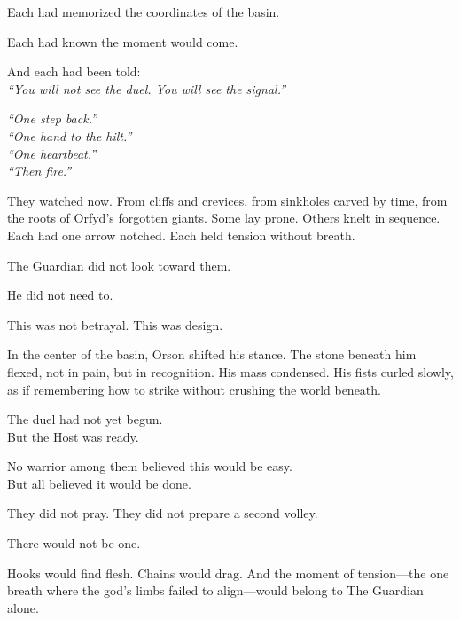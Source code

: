 \documentclass[12pt]{article}
\begin{document}
\vspace{0.5em}
Each had memorized the coordinates of the basin.

\vspace{0.5em}
Each had known the moment would come.

\vspace{0.5em}
And each had been told:\\
\textit{``You will not see the duel. You will see the signal.''}

\vspace{0.5em}
\textit{``One step back.''}\\
\textit{``One hand to the hilt.''}\\
\textit{``One heartbeat.''}\\
\textit{``Then fire.''}

\vspace{0.5em}
They watched now. From cliffs and crevices, from sinkholes carved by time, from the roots of Orfyd’s forgotten giants. Some lay prone. Others knelt in sequence. Each had one arrow notched. Each held tension without breath.

\vspace{0.5em}
The Guardian did not look toward them.

\vspace{0.5em}
He did not need to.

\vspace{0.5em}
This was not betrayal. This was design.

\vspace{0.5em}
In the center of the basin, Orson shifted his stance. The stone beneath him flexed, not in pain, but in recognition. His mass condensed. His fists curled slowly, as if remembering how to strike without crushing the world beneath.

\vspace{0.5em}
The duel had not yet begun.\\
But the Host was ready.

\vspace{0.5em}
No warrior among them believed this would be easy.\\
But all believed it would be done.

\vspace{0.5em}
They did not pray. They did not prepare a second volley.

\vspace{0.5em}
There would not be one.

\vspace{0.5em}
Hooks would find flesh. Chains would drag. And the moment of tension---the one breath where the god’s limbs failed to align---would belong to The Guardian alone.
\end{document}
